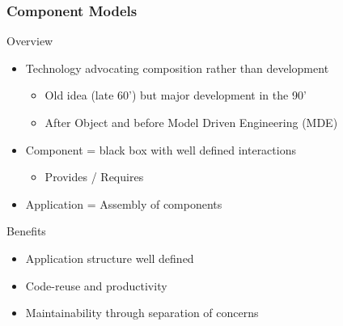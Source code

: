 \documentclass{beamer}
\begin{document}
\begin{frame}
  \frametitle{Component Models} %
  \begin{block}{Overview}
    \begin{itemize}
    \item Technology advocating composition rather than development
      \begin{itemize}
      \item Old idea (late 60') but major development in the 90'
      \item After Object and before Model Driven Engineering (MDE)
      \end{itemize}
    \item Component = black box with well defined interactions
      \begin{itemize}
      \item Provides / Requires
      \end{itemize}
    \item Application = Assembly of components
    \end{itemize}
  \end{block}
  \begin{block}{Benefits}
    \begin{itemize}
      \item Application structure well defined
    \item Code-reuse and productivity
    \item Maintainability through separation of concerns
    \end{itemize}
  \end{block}

\end{frame}
\end{document}
